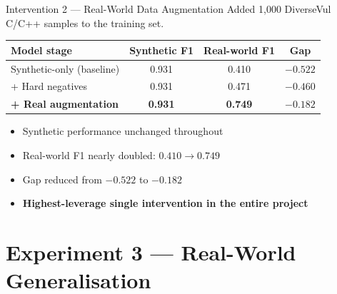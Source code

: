 \documentclass[aspectratio=169]{beamer}
\newcommand{\good}[1]{\textcolor{green!60!black}{#1}}
\begin{document}
\begin{frame}{Intervention 2 — Real-World Data Augmentation}
  Added 1{,}000 DiverseVul C/C++ samples to the training set.

  \vspace{0.5em}
  \begin{center}
    \begin{tabular}{lccc}
      \toprule
      Model stage & Synthetic F1 & Real-world F1 & Gap \\
      \midrule
      Synthetic-only (baseline) & 0.931 & 0.410 & $-0.522$ \\
      + Hard negatives          & 0.931 & 0.471 & $-0.460$ \\
      \textbf{+ Real augmentation} & \textbf{0.931} & \textbf{0.749} & $\mathbf{-0.182}$ \\
      \bottomrule
    \end{tabular}
  \end{center}

  \vspace{0.4em}
  \begin{itemize}
    \item Synthetic performance \good{unchanged} throughout
    \item Real-world F1 nearly doubled: $0.410 \to 0.749$
    \item Gap reduced from $-0.522$ to $-0.182$
    \item \textbf{Highest-leverage single intervention in the entire project}
  \end{itemize}
\end{frame}

\section{Experiment 3 — Real-World Generalisation}
\end{document}
